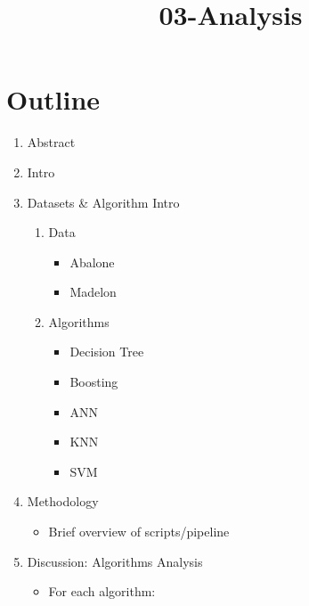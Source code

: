\documentclass[11pt]{article}
\title{03-Analysis}
\providecommand{\tightlist}{%
      \setlength{\itemsep}{0pt}\setlength{\parskip}{0pt}}
\begin{document}
    
    
    \maketitle
    
    

    
    \hypertarget{outline}{%
\section{Outline}\label{outline}}

\begin{enumerate}
\def\labelenumi{\arabic{enumi}.}
\tightlist
\item
  Abstract
\item
  Intro
\item
  Datasets \& Algorithm Intro

  \begin{enumerate}
  \def\labelenumii{\arabic{enumii}.}
  \tightlist
  \item
    Data

    \begin{itemize}
    \tightlist
    \item
      Abalone
    \item
      Madelon
    \end{itemize}
  \item
    Algorithms

    \begin{itemize}
    \tightlist
    \item
      Decision Tree
    \item
      Boosting
    \item
      ANN
    \item
      KNN
    \item
      SVM
    \end{itemize}
  \end{enumerate}
\item
  Methodology

  \begin{itemize}
  \tightlist
  \item
    Brief overview of scripts/pipeline
  \end{itemize}
\item
  Discussion: Algorithms Analysis

  \begin{itemize}
  \tightlist
  \item
    For each algorithm:


\end{itemize}
\end{enumerate}
\end{document}
